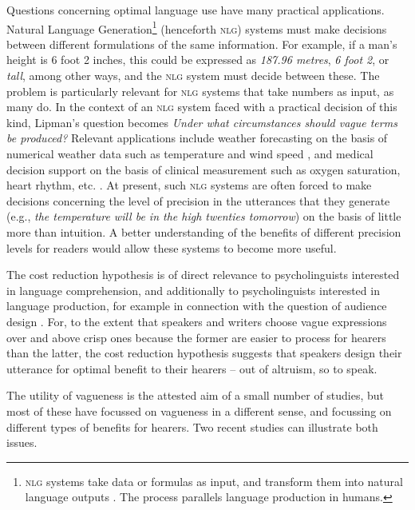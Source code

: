 Questions concerning optimal language use have many practical applications. Natural Language Generation\footnote{\textsc{nlg} systems take data or formulas as input, and transform them into natural language outputs \cite[][]{reiter2000building}. The process parallels language production in humans.}  (henceforth \textsc{nlg}) systems must make decisions between different formulations of the same information. For example, if a man's height is 6 foot 2 inches, this could be expressed as \emph{187.96 metres}, \emph{6 foot 2}, or \emph{tall}, among other ways, and the \textsc{nlg} system must decide between these.  The problem is particularly relevant for \textsc{nlg} systems that take numbers as input, as many do. In the context of an \textsc{nlg} system faced with a practical decision of this kind, Lipman's question becomes \emph{Under what circumstances should vague terms be produced?}  Relevant applications include weather forecasting on the basis of numerical weather data such as temperature and wind speed \citep{goldberg1994using, turner2006generating}, and medical decision support on the basis of clinical measurement such as oxygen saturation, heart rhythm, etc. \citep{Hripcsak01032009, hunter2008summarising, portet2009automatic}. At present, such \textsc{nlg} systems are often forced to make decisions concerning the level of precision in the utterances that they generate (e.g., \emph{the temperature will be in the high twenties tomorrow}) on the basis of little more than intuition. A better understanding of the benefits of different precision levels for readers would allow these systems to become more useful. 

The cost reduction hypothesis is of direct relevance to psycholinguists interested in language comprehension, and additionally to psycholinguists interested in language production, for example in connection with the question of audience design \citep{Clark1982287}. For, to the extent that speakers and writers choose vague expressions over and above crisp ones because the former are easier to process for hearers than the latter, the cost reduction hypothesis suggests that speakers design their utterance for optimal benefit to their hearers -- out of altruism, so to speak.

The utility of vagueness is the attested aim of a small number of studies, but most of these have focussed on vagueness in a different sense, and focussing on different types of benefits for hearers. Two recent studies can illustrate both issues. 

